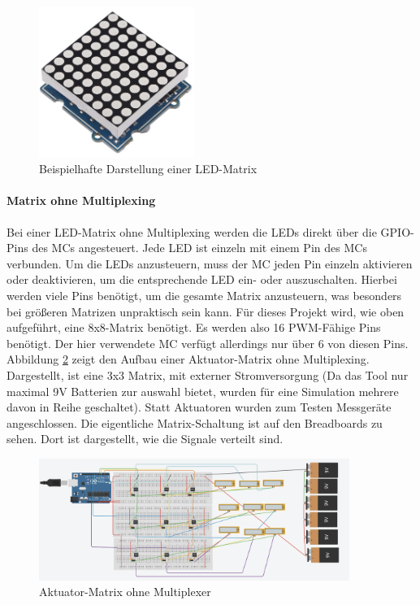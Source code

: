 \begin{figure}[htbp]
	\centering
	\includegraphics[width=0.45\textwidth]{img/LED-Matrix}
	\caption{Beispielhafte Darstellung einer LED-Matrix \cite*[siehe ][]{LEDMatrixTreiberplatine}}
	\label{img:LED-Matrix}
\end{figure}

\paragraph{Matrix ohne Multiplexing}

Bei einer LED-Matrix ohne Multiplexing werden die LEDs direkt über die \ac{GPIO}-Pins des
\ac{MC}s angesteuert. Jede LED ist einzeln mit einem Pin des \ac{MC}s verbunden. Um die LEDs anzusteuern,
muss der \ac{MC} jeden Pin einzeln aktivieren oder deaktivieren, um die entsprechende LED ein- oder auszuschalten.
Hierbei werden viele Pins benötigt, um die gesamte Matrix anzusteuern, was besonders bei größeren Matrizen unpraktisch
sein kann. Für dieses Projekt wird, wie oben aufgeführt, eine 8x8-Matrix benötigt. Es werden also 16 PWM-Fähige Pins
benötigt. Der hier verwendete \ac{MC} verfügt allerdings nur über 6 von diesen Pins.\newline
Abbildung \ref{fig:AktMatrix} zeigt den Aufbau einer Aktuator-Matrix ohne Multiplexing. Dargestellt, ist eine 3x3
Matrix, mit externer Stromversorgung (Da das Tool nur maximal 9V Batterien zur auswahl bietet, wurden für eine Simulation
mehrere davon in Reihe geschaltet). Statt Aktuatoren wurden zum Testen Messgeräte angeschlossen.
Die eigentliche Matrix-Schaltung ist auf den Breadboards zu sehen. Dort ist dargestellt, wie die Signale verteilt sind.
 \begin{figure}[htbp]
 	\centering
 	\includegraphics[width=0.9\textwidth]{img/AktMatrix}
 	\caption{Aktuator-Matrix ohne Multiplexer}
 	\label{fig:AktMatrix}
 \end{figure}

